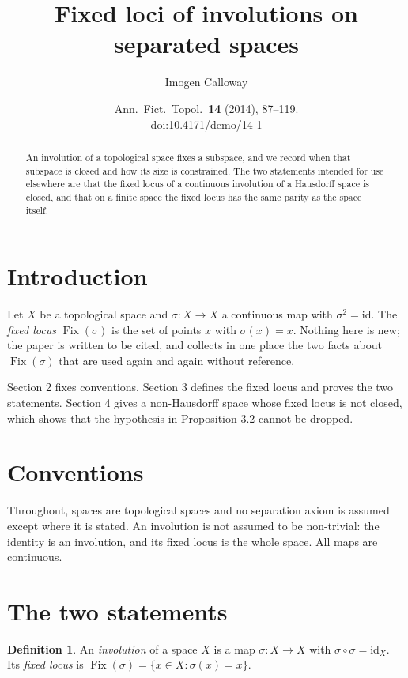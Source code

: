 \documentclass[11pt]{article}
\title{Fixed loci of involutions on separated spaces}
\author{Imogen Calloway}
\date{Ann.\ Fict.\ Topol.\ \textbf{14} (2014), 87--119. \\ doi:10.4171/demo/14-1}
\theoremstyle{plain}
\theoremstyle{definition}
\newtheorem{definition}[theorem]{Definition}
\DeclareMathOperator{\Fix}{Fix}
\begin{document}
\maketitle

\begin{abstract}
An involution of a topological space fixes a subspace, and we record when that subspace is closed and how its size is constrained. The two statements intended for use elsewhere are that the fixed locus of a continuous involution of a Hausdorff space is closed, and that on a finite space the fixed locus has the same parity as the space itself.
\end{abstract}

\section{Introduction}

Let $X$ be a topological space and $\sigma \colon X \to X$ a continuous map with $\sigma^2 = \mathrm{id}$. The \emph{fixed locus} $\Fix(\sigma)$ is the set of points $x$ with $\sigma(x) = x$. Nothing here is new; the paper is written to be cited, and collects in one place the two facts about $\Fix(\sigma)$ that are used again and again without reference.

Section 2 fixes conventions. Section 3 defines the fixed locus and proves the two statements. Section 4 gives a non-Hausdorff space whose fixed locus is not closed, which shows that the hypothesis in Proposition 3.2 cannot be dropped.

\section{Conventions}

Throughout, spaces are topological spaces and no separation axiom is assumed except where it is stated. An involution is not assumed to be non-trivial: the identity is an involution, and its fixed locus is the whole space. All maps are continuous.

\section{The two statements}

\begin{definition}\label{def:involution}
An \emph{involution} of a space $X$ is a map $\sigma \colon X \to X$ with $\sigma \circ \sigma = \mathrm{id}_X$. Its \emph{fixed locus} is $\Fix(\sigma) = \{x \in X : \sigma(x) = x\}$.
\end{definition}
\end{document}
